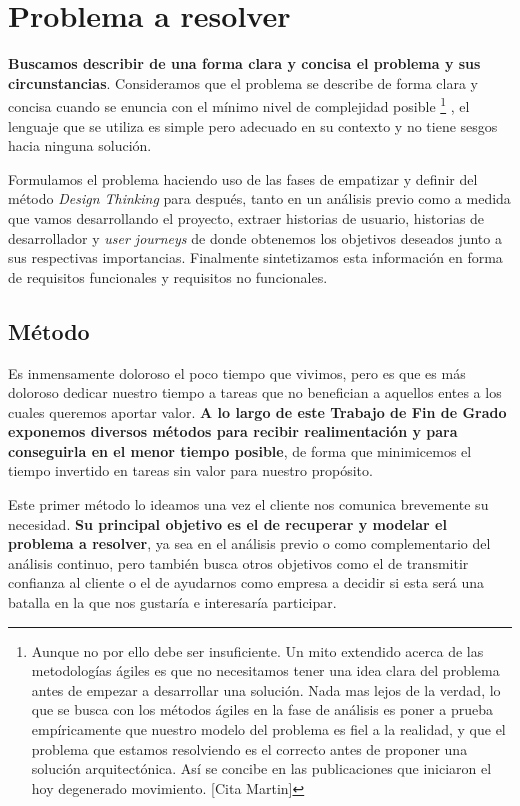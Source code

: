 \chapter{Problema a resolver}

\textbf{Buscamos describir de una forma clara y concisa el problema y sus
circunstancias}. Consideramos que el problema se describe de forma clara y
concisa cuando se enuncia con el mínimo nivel de complejidad posible%
%
\footnote{Aunque
no por ello debe ser insuficiente. Un mito extendido acerca de las metodologías ágiles
es que no necesitamos tener una idea clara del problema antes de empezar a desarrollar
una solución. Nada mas lejos de la verdad, lo que se busca con los métodos ágiles en la
fase de análisis es poner a prueba empíricamente que nuestro modelo del problema es fiel
a la realidad, y que el problema que estamos resolviendo es el correcto antes de proponer
una solución arquitectónica. Así se concibe en las publicaciones que iniciaron el hoy
degenerado movimiento. [Cita Martin]
}%
, el lenguaje que se utiliza es simple pero adecuado
en su contexto y no tiene sesgos hacia ninguna solución. 

Formulamos el problema haciendo uso de las fases de empatizar y definir del método
\textit{Design Thinking} para después, tanto en un análisis previo como a medida
que vamos desarrollando el proyecto, extraer historias de usuario, historias de
desarrollador y \textit{user journeys} de donde obtenemos los objetivos deseados
junto a sus respectivas importancias.
Finalmente sintetizamos esta información en forma de requisitos funcionales y
requisitos no funcionales.

\section{Método}

Es inmensamente doloroso el poco tiempo que vivimos, pero es que es más doloroso dedicar
nuestro tiempo a tareas que no benefician a aquellos entes a los cuales queremos aportar
valor.
\textbf{A lo largo de este Trabajo de Fin de Grado exponemos diversos métodos para recibir
realimentación y para conseguirla en el menor tiempo posible}, de forma que minimicemos
el tiempo invertido en tareas sin valor para nuestro propósito.

Este primer método lo ideamos una vez el cliente nos comunica brevemente su necesidad.
\textbf{Su principal objetivo es el de recuperar y modelar el problema a resolver}, ya sea en
el análisis previo o como complementario del análisis continuo, pero también busca
otros objetivos como el de transmitir confianza al cliente o el de ayudarnos como empresa a
decidir si esta será una batalla en la que nos gustaría e interesaría participar.

